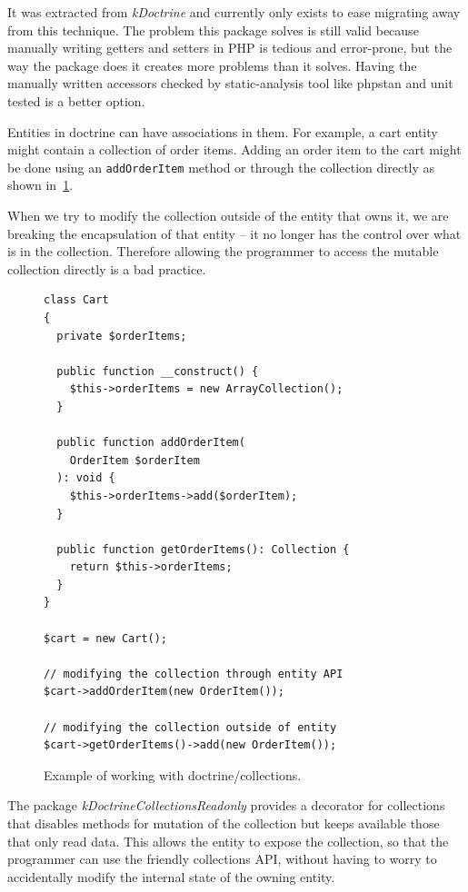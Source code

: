 It was extracted from \textit{\gls{kDoctrine}} and currently only exists to ease migrating away from this technique. The problem this package solves is still valid because manually writing getters and setters in PHP is tedious and error-prone, but the way the package does it creates more problems than it solves. Having the manually written accessors checked by static-analysis tool like \gls{phpstan} and unit tested is a better option.

 \label{sec:state:doctrine-collections-readonly}

Entities in \gls{doctrine} can have associations in them. For example, a cart entity might contain a collection of order items. Adding an order item to the cart might be done using an \lstinline{addOrderItem} method or through the collection directly as shown in~\ref{fig:collections-readonly:example}.

When we try to modify the collection outside of the entity that owns it, we are breaking the encapsulation of that entity -- it no longer has the control over what is in the collection. Therefore allowing the programmer to access the mutable collection directly is a bad practice.

\begin{figure} \label{fig:collections-readonly:example}
\begin{lstlisting}
class Cart
{
  private $orderItems;

  public function __construct() {
    $this->orderItems = new ArrayCollection();
  }

  public function addOrderItem(
    OrderItem $orderItem
  ): void {
    $this->orderItems->add($orderItem);
  }

  public function getOrderItems(): Collection {
    return $this->orderItems;
  }
}

$cart = new Cart();

// modifying the collection through entity API
$cart->addOrderItem(new OrderItem());

// modifying the collection outside of entity
$cart->getOrderItems()->add(new OrderItem());
\end{lstlisting}
\caption{Example of working with doctrine/collections.}
\end{figure}

The package \textit{\gls{kDoctrineCollectionsReadonly}} provides a decorator for collections that disables methods for mutation of the collection but keeps available those that only read data. This allows the entity to expose the collection, so that the programmer can use the friendly collections API, without having to worry to accidentally modify the internal state of the owning entity.

